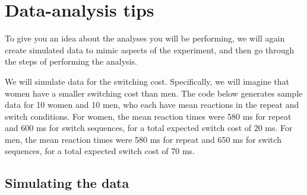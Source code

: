 


\section{Data-analysis tips}\label{lab-5-data-analysis-tips}

To give you an idea about the analyses you will be performing, we will
again create simulated data to mimic aspects of the experiment, and then
go through the steps of performing the analysis.

We will simulate data for the switching cost. Specifically, we will
imagine that women have a smaller switching cost than men. The code
below generates sample data for 10 women and 10 men, who each have mean
reactions in the repeat and switch conditions. For women, the mean
reaction times were 580 ms for repeat and 600 ms for switch sequences,
for a total expected switch cost of 20 ms. For men, the mean reaction
times were 580 ms for repeat and 650 ms for switch sequences, for a
total expected switch cost of 70 ms.

\subsection{Simulating the data}\label{simulating-the-data}

